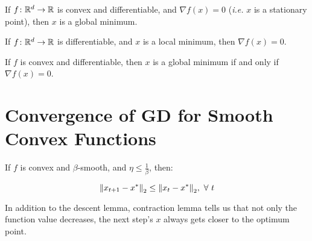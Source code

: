 \begin{lemma}
    If \(f \colon \mathbb{R}^d \to \mathbb{R}\) is convex and differentiable, and \(\nabla f(x) = 0\) 
    (\emph{i.e.} \(x\) is a stationary point), then \(x\) is a global minimum. 
\end{lemma}

\begin{lemma}
    If \(f \colon \mathbb{R}^d \to \mathbb{R}\) is differentiable, and \(x\) is a local minimum, then 
    \(\nabla f(x) = 0\). 
\end{lemma} 

\begin{corollary}
    If \(f\) is convex and differentiable, then \(x\) is a global minimum if and only 
    if \(\nabla f(x) = 0\). 
\end{corollary}


\section{Convergence of GD for Smooth Convex Functions}



\begin{lemma} 
    If \(f\) is convex and \(\beta\)-smooth, and \(\eta \leq \frac{1}{\beta}\), then: 

    \[
        \norm{x_{t+1} - x^*}_2 \leq \norm{x_t - x^*}_2, \ \forall \ t   
    \]
\end{lemma}

\begin{remark}
    In addition to the descent lemma, contraction lemma tells us that not only the function value 
    decreases, the next step's \(x\) always gets closer to the optimum point. 
\end{remark}



